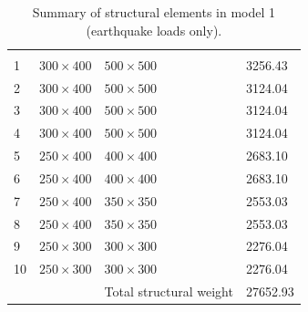 \documentclass{cup-pan}
\begin{document}
\begin{table}[H]
\renewcommand{\arraystretch}{1.5}
\caption{Summary of structural elements in model 1 (earthquake loads only).}
\label{tab:cross section model 1}
\centering
\begin{tabular}{P{1in} P{1in} P{1in} P{1.5in}}
\headrow {} &  &  &  \\
1 & $300 \times 400$ & $500 \times 500$ & \num{3256.43}  \\
2 & $300 \times 400$ & $500 \times 500$ & \num{3124.04}  \\
3 & $300 \times 400$ & $500 \times 500$ & \num{3124.04}  \\
4 & $300 \times 400$ & $500 \times 500$ & \num{3124.04}  \\
5 & $250 \times 400$ & $400 \times 400$ & \num{2683.10}  \\
6 & $250 \times 400$ & $400 \times 400$ & \num{2683.10}  \\
7 & $250 \times 400$ & $350 \times 350$ & \num{2553.03}  \\
8 & $250 \times 400$ & $350 \times 350$ & \num{2553.03}  \\
9 & $250 \times 300$ & $300 \times 300$ & \num{2276.04}  \\
10 & $250 \times 300$ & $300 \times 300$ & \num{2276.04}  \\
 &  & Total structural weight & \num{27652.93}  \\
\end{tabular}
\end{table}  
\end{document}
